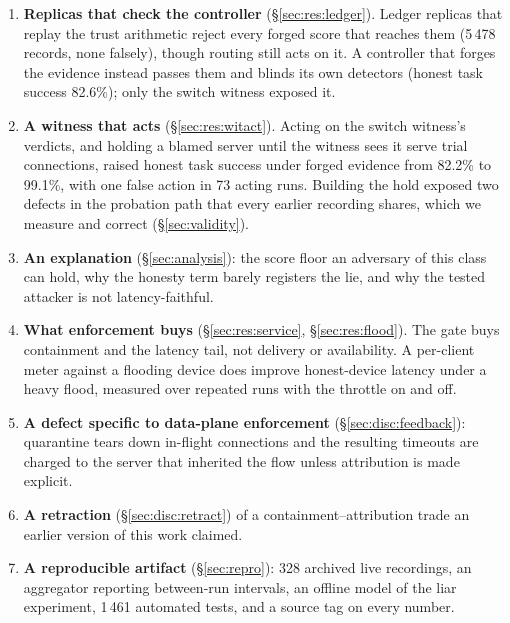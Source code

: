 \documentclass[10pt,twocolumn,letterpaper]{article}
\begin{document}
\begin{enumerate}[leftmargin=1.2em,itemsep=2pt,topsep=2pt]
\item \textbf{Replicas that check the controller} (\S\ref{sec:res:ledger}).
  Ledger replicas that replay the trust arithmetic reject every forged score
  that reaches them (5\,478 records, none falsely), though routing still acts
  on it. A controller that forges the evidence instead passes them and blinds
  its own detectors (honest task success 82.6\%); only the switch witness
  exposed it.

\item \textbf{A witness that acts} (\S\ref{sec:res:witact}). Acting on the
  switch witness's verdicts, and holding a blamed server until the witness sees
  it serve trial connections, raised honest task success under forged evidence
  from 82.2\% to 99.1\%, with one false action in 73 acting runs. Building the
  hold exposed two defects in the probation path that every earlier recording
  shares, which we measure and correct (\S\ref{sec:validity}).

\item \textbf{An explanation} (\S\ref{sec:analysis}): the score floor an
  adversary of this class can hold, why the honesty term barely registers the
  lie, and why the tested attacker is not latency-faithful.

\item \textbf{What enforcement buys} (\S\ref{sec:res:service},
  \S\ref{sec:res:flood}). The gate buys containment and the latency tail, not
  delivery or availability. A per-client meter against a flooding device does
  improve honest-device latency under a heavy flood, measured over repeated
  runs with the throttle on and off.

\item \textbf{A defect specific to data-plane enforcement}
  (\S\ref{sec:disc:feedback}): quarantine tears down in-flight connections and
  the resulting timeouts are charged to the server that inherited the flow
  unless attribution is made explicit.

\item \textbf{A retraction} (\S\ref{sec:disc:retract}) of a
  containment--attribution trade an earlier version of this work claimed.

\item \textbf{A reproducible artifact} (\S\ref{sec:repro}): 328 archived live
  recordings, an aggregator reporting between-run intervals, an offline model
  of the liar experiment, 1\,461 automated tests, and a source tag on every
  number.
\end{enumerate}
\end{document}
